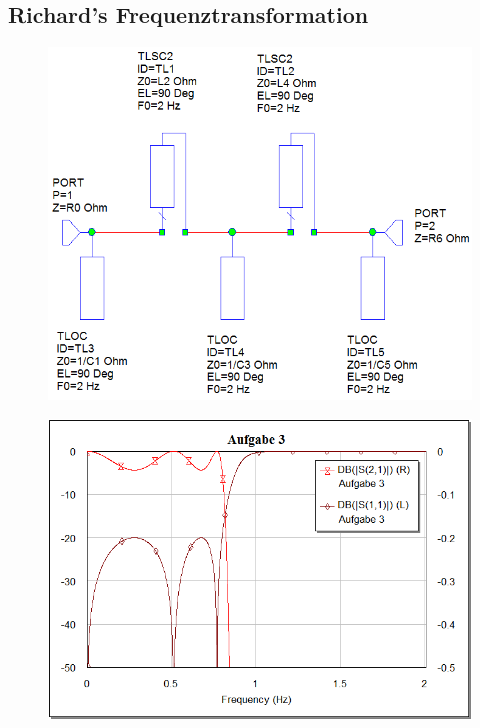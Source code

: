 \subsection{Richard's Frequenztransformation}

\begin{figure}
    \centering
    \includegraphics[width=\imagewidth]{images/stripline-richards}
    \caption{}
\end{figure}

\begin{figure}
    \centering
    \includegraphics[width=\imagewidth]{images/graph-richards}
    \caption{}
\end{figure}


